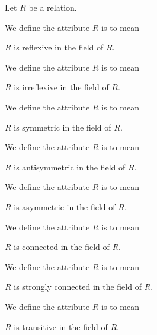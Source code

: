 \documentclass{article}
\begin{document}
\begin{definition}
Let $R$ be a relation.

We define the attribute $R$ is  to mean
\begin{defn}
\item $R$ is reflexive in the field of $R$.
\end{defn}
We define the attribute $R$ is  to mean
\begin{defn}
\item $R$ is irreflexive in the field of $R$.
\end{defn}
We define the attribute $R$ is  to mean
\begin{defn}
\item $R$ is symmetric in the field of $R$.
\end{defn}
We define the attribute $R$ is  to mean
\begin{defn}
\item $R$ is antisymmetric in the field of $R$.
\end{defn}
We define the attribute $R$ is  to mean
\begin{defn}
\item $R$ is asymmetric in the field of $R$.
\end{defn}
We define the attribute $R$ is  to mean
\begin{defn}
\item $R$ is connected in the field of $R$.
\end{defn}
We define the attribute $R$ is  to mean
\begin{defn}
\item $R$ is strongly connected in the field of $R$.
\end{defn}
We define the attribute $R$ is  to mean
\begin{defn}
\item $R$ is transitive in the field of $R$.
\end{defn}
\end{definition}
\end{document}
